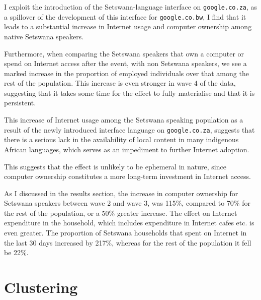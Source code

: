 \documentclass[a4paper,british]{article}\usepackage[]{graphicx}\usepackage[]{color}
\providecommand*{\code}[1]{\texttt{#1}}
\begin{document}
I exploit the introduction of the Setswana-language interface on \code{google.co.za},
as a spillover of the development of this interface for \code{google.co.bw},
I find that it leads to a substantial increase in Internet usage and
computer ownership among native Setswana speakers.

Furthermore, when comparing the Setswana speakers that own a computer
or spend on Internet access after the event, with non Setswana speakers,
we see a marked increase in the proportion of employed individuals
over that among the rest of the population. This increase is even
stronger in wave 4 of the data, suggesting that it takes some time
for the effect to fully materialise and that it is persistent.

This increase of Internet usage among the Setswana speaking population
as a result of the newly introduced interface language on \code{google.co.za},
suggests that there is a serious lack in the availability of local
content in many indigenous African languages, which serves as an impediment
to further Internet adoption. 

 This suggests that the effect is unlikely to be ephemeral in nature,
since computer ownership constitutes a more long-term investment in
Internet access.

As I discussed in the results section, the increase in computer ownership
for Setswana speakers between wave 2 and wave 3, was 115\%, compared
to 70\% for the rest of the population, or a 50\% greater increase.
The effect on Internet expenditure in the household, which includes
expenditure in Internet cafes etc. is even greater. The proportion
of Setswana households that spent on Internet in the last 30 days
increased by 217\%, whereas for the rest of the population it fell
be 22\%.

\newpage{}

\printbibliography


\appendix

\section{Clustering}
\end{document}
